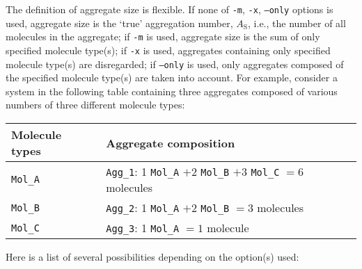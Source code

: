 The definition of aggregate size is flexible. If none of \texttt{-m},
\texttt{-x}, \texttt{--only} options is used, aggregate size is the `true'
aggregation number, $A_{\mathrm{S}}$, i.e., the number of all molecules in
the aggregate; if \texttt{-m} is used, aggregate size is the sum of only
specified molecule type(s); if \texttt{-x} is used, aggregates containing
only specified molecule type(s) are disregarded; if \texttt{--only} is
used, only aggregates composed of the specified molecule type(s) are taken
into account. For example, consider a system in the following table
containing three aggregates composed of various numbers of three different
molecule types:
\noindent
\begin{longtable}{l|l}
  \toprule
  Molecule types & Aggregate composition \\
  \midrule
  \texttt{Mol\_A} & \texttt{Agg\_1}: 1 \texttt{Mol\_A} $+2$ \texttt{Mol\_B} $+3$ \texttt{Mol\_C} $=6$ molecules \\
  \texttt{Mol\_B} & \texttt{Agg\_2}: 1 \texttt{Mol\_A} $+2$ \texttt{Mol\_B} $=3$ molecules \\
  \texttt{Mol\_C} & \texttt{Agg\_3}: 1 \texttt{Mol\_A} $=1$ molecule \\
  \bottomrule
\end{longtable}
\noindent
Here is a list of several possibilities depending on the option(s) used:
